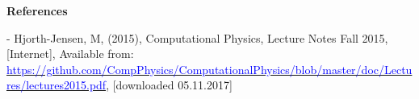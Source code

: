 \documentclass[10pt,a4paper]{article}
\begin{document}
\newpage

\begin{center}
{\LARGE\bf References}
\end{center}

\noindent - Hjorth-Jensen, M, (2015), Computational Physics, Lecture Notes Fall 2015, [Internet], Available from: \href{https://github.com/CompPhysics/ComputationalPhysics/blob/master/doc/Lectures/lectures2015.pdf}{\textcolor{blue}{https://github.com/CompPhysics/ComputationalPhysics/blob/master/doc/Lectures/lectures2015.pdf}}, [downloaded 05.11.2017]
\end{document}
